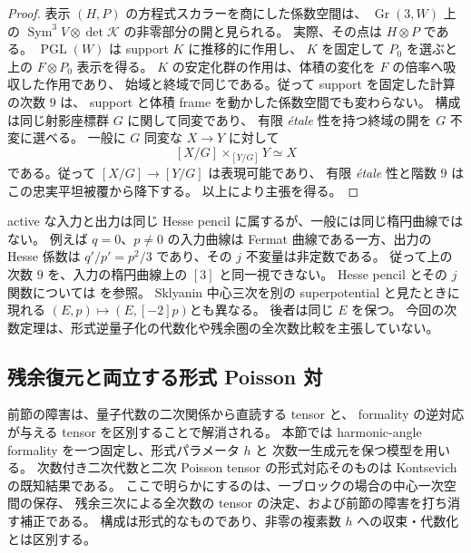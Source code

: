 \begin{proof}
表示 $(H,P)$ の方程式スカラーを商にした係数空間は、
$\operatorname{Gr}(3,W)$ 上の
$\operatorname{Sym}^3V\otimes\det\mathcal K$ の非零部分の開と見られる。
実際、その点は $H\otimes P$ である。
$\operatorname{PGL}(W)$ は support $K$ に推移的に作用し、
$K$ を固定して $P_0$ を選ぶと上の $F\otimes P_0$ 表示を得る。
$K$ の安定化群の作用は、体積の変化を $F$ の倍率へ吸収した作用であり、
始域と終域で同じである。従って support を固定した計算の次数 $9$ は、
support と体積 frame を動かした係数空間でも変わらない。
構成は同じ射影座標群 $G$ に関して同変であり、
有限 \emph{\'etale} 性を持つ終域の開を $G$ 不変に選べる。
一般に $G$ 同変な $X\to Y$ に対して
\[
 [X/G]\mathbin{\times}_{[Y/G]}Y\simeq X
\]
である。従って $[X/G]\to[Y/G]$ は表現可能であり、
有限 \emph{\'etale} 性と階数 $9$ はこの忠実平坦被覆から降下する。
以上により主張を得る。
\end{proof}

\begin{remark}
\label{rem:nfm-degree-not-multiplication}
active な入力と出力は同じ Hesse pencil に属するが、一般には同じ楕円曲線ではない。
例えば $q=0$、$p\ne0$ の入力曲線は Fermat 曲線である一方、出力の
Hesse 係数は $q'/p'=p^2/3$ であり、その $j$ 不変量は非定数である。
従って上の次数 $9$ を、入力の楕円曲線上の $[3]$ と同一視できない。
Hesse pencil とその $j$ 関数については
\cite[Section~2, Lemma~2.1, equations~(4)--(5)]{NFMArtebaniDolgachev}を参照。
Sklyanin 中心三次を別の superpotential と見たときに現れる
$(E,p)\mapsto(E,[-2]p)$\cite[Section~2]{NFMDLL}とも異なる。
後者は同じ $E$ を保つ。
今回の次数定理は、形式逆量子化の代数化や残余圏の全次数比較を主張していない。
\end{remark}

\subsection{残余復元と両立する形式 Poisson 対}
\label{sec:nfm-corrected-formal-poisson}

前節の障害は、量子代数の二次関係から直読する tensor と、
formality の逆対応が与える tensor を区別することで解消される。
本節では harmonic-angle formality を一つ固定し、形式パラメータ $h$ と
次数一生成元を保つ模型を用いる。
次数付き二次代数と二次 Poisson tensor の形式対応そのものは
Kontsevich\cite[Section~2.3, Proposition~6]{NFMKontsevichAlg}の既知結果である。
ここで明らかにするのは、一ブロックの場合の中心一次空間の保存、
残余三次による全次数の tensor の決定、および前節の障害を打ち消す補正である。
構成は形式的なものであり、非零の複素数 $h$ への収束・代数化とは区別する。

